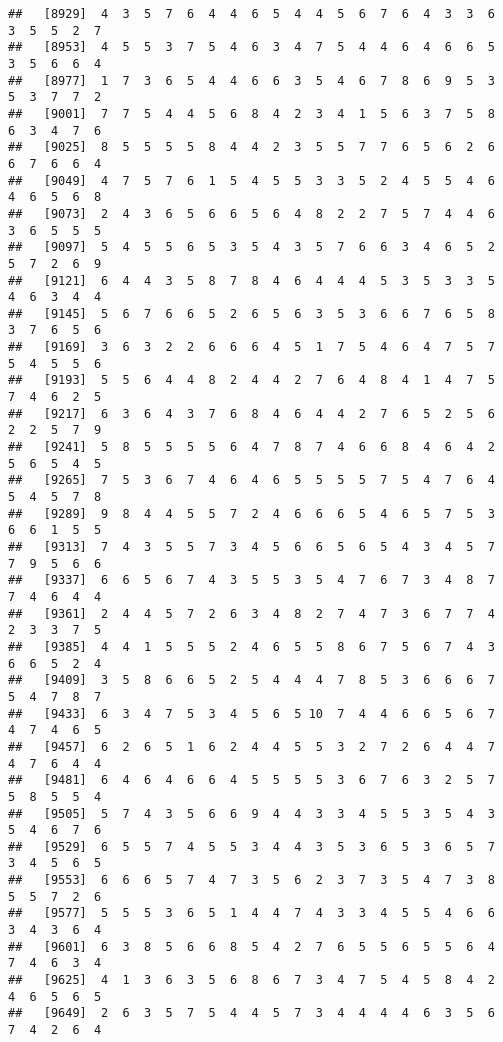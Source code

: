 \documentclass[
]{book}
\begin{document}
\begin{verbatim}
##   [8929]  4  3  5  7  6  4  4  6  5  4  4  5  6  7  6  4  3  3  6  3  5  5  2  7
##   [8953]  4  5  5  3  7  5  4  6  3  4  7  5  4  4  6  4  6  6  5  3  5  6  6  4
##   [8977]  1  7  3  6  5  4  4  6  6  3  5  4  6  7  8  6  9  5  3  5  3  7  7  2
##   [9001]  7  7  5  4  4  5  6  8  4  2  3  4  1  5  6  3  7  5  8  6  3  4  7  6
##   [9025]  8  5  5  5  5  8  4  4  2  3  5  5  7  7  6  5  6  2  6  6  7  6  6  4
##   [9049]  4  7  5  7  6  1  5  4  5  5  3  3  5  2  4  5  5  4  6  4  6  5  6  8
##   [9073]  2  4  3  6  5  6  6  5  6  4  8  2  2  7  5  7  4  4  6  3  6  5  5  5
##   [9097]  5  4  5  5  6  5  3  5  4  3  5  7  6  6  3  4  6  5  2  5  7  2  6  9
##   [9121]  6  4  4  3  5  8  7  8  4  6  4  4  4  5  3  5  3  3  5  4  6  3  4  4
##   [9145]  5  6  7  6  6  5  2  6  5  6  3  5  3  6  6  7  6  5  8  3  7  6  5  6
##   [9169]  3  6  3  2  2  6  6  6  4  5  1  7  5  4  6  4  7  5  7  5  4  5  5  6
##   [9193]  5  5  6  4  4  8  2  4  4  2  7  6  4  8  4  1  4  7  5  7  4  6  2  5
##   [9217]  6  3  6  4  3  7  6  8  4  6  4  4  2  7  6  5  2  5  6  2  2  5  7  9
##   [9241]  5  8  5  5  5  5  6  4  7  8  7  4  6  6  8  4  6  4  2  5  6  5  4  5
##   [9265]  7  5  3  6  7  4  6  4  6  5  5  5  5  7  5  4  7  6  4  5  4  5  7  8
##   [9289]  9  8  4  4  5  5  7  2  4  6  6  6  5  4  6  5  7  5  3  6  6  1  5  5
##   [9313]  7  4  3  5  5  7  3  4  5  6  6  5  6  5  4  3  4  5  7  7  9  5  6  6
##   [9337]  6  6  5  6  7  4  3  5  5  3  5  4  7  6  7  3  4  8  7  7  4  6  4  4
##   [9361]  2  4  4  5  7  2  6  3  4  8  2  7  4  7  3  6  7  7  4  2  3  3  7  5
##   [9385]  4  4  1  5  5  5  2  4  6  5  5  8  6  7  5  6  7  4  3  6  6  5  2  4
##   [9409]  3  5  8  6  6  5  2  5  4  4  4  7  8  5  3  6  6  6  7  5  4  7  8  7
##   [9433]  6  3  4  7  5  3  4  5  6  5 10  7  4  4  6  6  5  6  7  4  7  4  6  5
##   [9457]  6  2  6  5  1  6  2  4  4  5  5  3  2  7  2  6  4  4  7  4  7  6  4  4
##   [9481]  6  4  6  4  6  6  4  5  5  5  5  3  6  7  6  3  2  5  7  5  8  5  5  4
##   [9505]  5  7  4  3  5  6  6  9  4  4  3  3  4  5  5  3  5  4  3  5  4  6  7  6
##   [9529]  6  5  5  7  4  5  5  3  4  4  3  5  3  6  5  3  6  5  7  3  4  5  6  5
##   [9553]  6  6  6  5  7  4  7  3  5  6  2  3  7  3  5  4  7  3  8  5  5  7  2  6
##   [9577]  5  5  5  3  6  5  1  4  4  7  4  3  3  4  5  5  4  6  6  3  4  3  6  4
##   [9601]  6  3  8  5  6  6  8  5  4  2  7  6  5  5  6  5  5  6  4  7  4  6  3  4
##   [9625]  4  1  3  6  3  5  6  8  6  7  3  4  7  5  4  5  8  4  2  4  6  5  6  5
##   [9649]  2  6  3  5  7  5  4  4  5  7  3  4  4  4  4  6  3  5  6  7  4  2  6  4

\end{verbatim}
\end{document}
